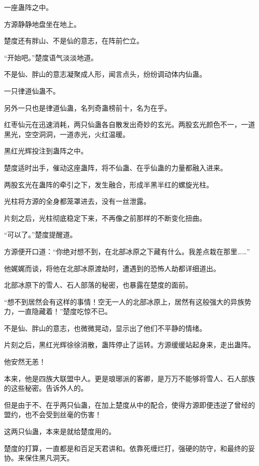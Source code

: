 
\begin{this_body}



一座蛊阵之中。

方源静静地盘坐在地上。

楚度还有胖山、不是仙的意志，在阵前伫立。

“开始吧。”楚度语气淡淡地道。

不是仙、胖山的意志凝聚成人形，闻言点头，纷纷调动体内仙蛊。

一只律道仙蛊不。

另外一只也是律道仙蛊，名列奇蛊榜前十，名为在乎。

红枣仙元在迅速消耗，两只仙蛊各自散发出奇妙的玄光。两股玄光颜色不一，一道黑光，空空洞洞，一道赤光，火红温暖。

黑红光辉投注到蛊阵之中。

楚度适时出手，催动这座蛊阵，将不仙蛊、在乎仙蛊的力量都融入进来。

两股玄光在蛊阵的牵引之下，发生融合，形成半黑半红的螺旋光柱。

光柱将方源的全身都笼罩进去，没有一丝泄露。

片刻之后，光柱彻底稳定下来，不再像之前那样的不断变化扭曲。

“可以了。”楚度提醒道。

方源便开口道：“你绝对想不到，在北部冰原之下藏有什么。我差点栽在那里……”

他娓娓而谈，将他在北部冰原渡劫时，遭遇到的恐怖人劫都详细道出。

北部冰原下的雪人、石人部落的秘密，也暴露在楚度的面前。

“想不到居然会有这样的事情！空无一人的北部冰原上，居然有这般强大的异族势力，一直隐藏着！”楚度吃惊不已。

不是仙、胖山的意志，也微微晃动，显示出了他们不平静的情绪。

片刻之后，黑红光辉徐徐消散，蛊阵停止了运转。方源缓缓站起身来，走出蛊阵。

他安然无恙！

本来，他是四族大联盟中人。更是琅琊派的客卿，是万万不能够将雪人、石人部族的这些秘密。告诉外人的。

但是由于不、在乎两只仙蛊，在加上楚度从中的配合，使得方源即便违逆了曾经的盟约，也不会受到丝毫的伤害！

这两只仙蛊，本来是就给楚度用的。

楚度的打算，一直都是和百足天君讲和。依靠死缠烂打，强硬的防守，和最终的妥协。来保住黑凡洞天。


\end{this_body}
